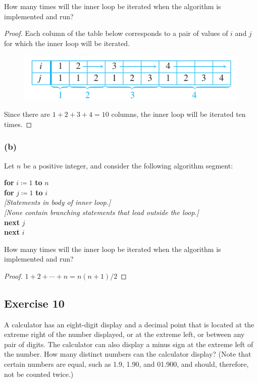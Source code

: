 \documentclass[14pt]{extarticle}
\begin{document}
How many times will the inner loop be iterated when the algorithm is implemented and run?

\begin{proof}
     Each column of the table below corresponds to a pair of values of $i$ and $j$ for which the inner loop will be iterated.

     \begin{figure}[ht!]
          \centering
          \includegraphics[scale=0.5]{../images/9.3.9.a.png}
     \end{figure}

     Since there are \(1 + 2 + 3 + 4 = 10\) columns, the inner loop will be iterated ten times.
\end{proof}

\subsubsection{(b)}
Let $n$ be a positive integer, and consider the following algorithm segment:

\begin{tabbing}
     {\bf for} \= \(i \coloneqq 1\) {\bf to} $n$ \\
     \> {\bf for} \= \(j \coloneqq 1\) {\bf to} $i$ \\
     \>           \> {\it [Statements in body of inner loop.]} \\
     \>           \> {\it [None contain branching statements that lead outside the loop.]} \\
     \> {\bf next} $j$ \\
     {\bf next} $i$
\end{tabbing}

How many times will the inner loop be iterated when the algorithm is implemented and run?

\begin{proof}
     \(1 + 2 + \cdots + n = n(n+1)/2\)
\end{proof}

\subsection{Exercise 10}
A calculator has an eight-digit display and a decimal point that is located at the extreme right of the number
displayed, or at the extreme left, or between any pair of digits. The calculator can also display a minus sign at the
extreme left of the number. How many distinct numbers can the calculator display? (Note that certain numbers are
equal, such as 1.9, 1.90, and 01.900, and should, therefore, not be counted twice.)
\end{document}
